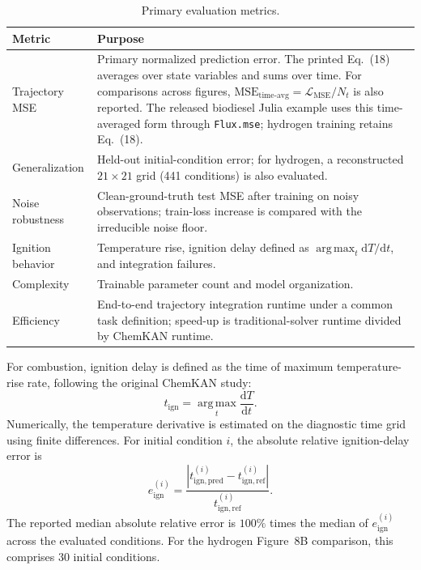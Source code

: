 \documentclass[11pt,a4paper]{article}
\newcommand{\dd}{\mathrm{d}}
\begin{document}
\begin{table}[H]
\centering
\small
\caption{Primary evaluation metrics.}
\label{tab:metrics}
\begin{tabularx}{\textwidth}{@{}p{}X@{}}
\toprule
\textbf{Metric} & \textbf{Purpose} \\
\midrule
Trajectory MSE & Primary normalized prediction error. The printed Eq.~(18) averages over state variables and sums over time. For comparisons across figures, $\mathrm{MSE}_{\mathrm{time\text{-}avg}}=\mathcal{L}_{\mathrm{MSE}}/N_t$ is also reported. The released biodiesel Julia example uses this time-averaged form through \texttt{Flux.mse}; hydrogen training retains Eq.~(18). \\
Generalization & Held-out initial-condition error; for hydrogen, a reconstructed $21\times21$ grid (441 conditions) is also evaluated. \\
Noise robustness & Clean-ground-truth test MSE after training on noisy observations; train-loss increase is compared with the irreducible noise floor. \\
Ignition behavior & Temperature rise, ignition delay defined as $\operatorname*{arg\,max}_t \dd T/\dd t$, and integration failures. \\
Complexity & Trainable parameter count and model organization. \\
Efficiency & End-to-end trajectory integration runtime under a common task definition; speed-up is traditional-solver runtime divided by ChemKAN runtime. \\
\bottomrule
\end{tabularx}
\end{table}


For combustion, ignition delay is defined
as the time of maximum temperature-rise rate,
following the original ChemKAN study:
\begin{equation}
t_{\mathrm{ign}}
=
\operatorname*{arg\,max}_{t}
\frac{\mathrm{d}T}{\mathrm{d}t}.
\end{equation}
Numerically, the temperature derivative is
estimated on the diagnostic time grid using
finite differences. For initial condition $i$,
the absolute relative ignition-delay error is
\begin{equation}
e_{\mathrm{ign}}^{(i)}
=
\frac{
\left|
t_{\mathrm{ign,pred}}^{(i)}
-
t_{\mathrm{ign,ref}}^{(i)}
\right|
}{
t_{\mathrm{ign,ref}}^{(i)}
}.
\end{equation}
The reported median absolute relative error
is $100\%$ times the median of
$e_{\mathrm{ign}}^{(i)}$ across the evaluated
conditions. For the hydrogen Figure~8B
comparison, this comprises 30 initial
conditions.
\end{document}
